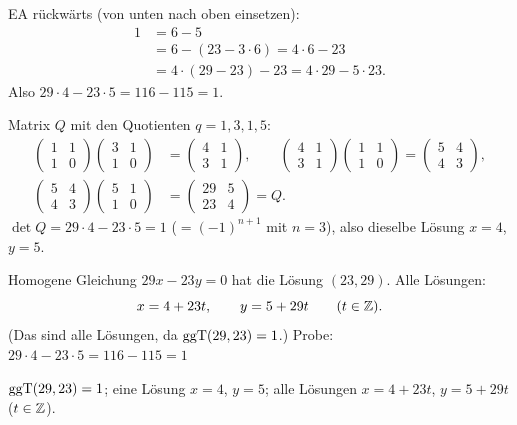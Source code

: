  EA rückwärts (von unten nach oben einsetzen):
\begin{align*}
1 &= 6 - 5\\
  &= 6 - (23 - 3 \cdot 6) = 4 \cdot 6 - 23\\
  &= 4 \cdot (29 - 23) - 23 = 4 \cdot 29 - 5 \cdot 23 .
\end{align*}
Also $29 \cdot 4 - 23 \cdot 5 = 116 - 115 = 1$.

Matrix $Q$ mit den Quotienten $q = 1, 3, 1, 5$:
\begin{align*}
\begin{pmatrix}1&1\\1&0\end{pmatrix}\begin{pmatrix}3&1\\1&0\end{pmatrix} &= \begin{pmatrix}4&1\\3&1\end{pmatrix},\qquad
\begin{pmatrix}4&1\\3&1\end{pmatrix}\begin{pmatrix}1&1\\1&0\end{pmatrix} = \begin{pmatrix}5&4\\4&3\end{pmatrix},\\
\begin{pmatrix}5&4\\4&3\end{pmatrix}\begin{pmatrix}5&1\\1&0\end{pmatrix} &= \begin{pmatrix}29&5\\23&4\end{pmatrix} = Q .
\end{align*}
$\det Q = 29 \cdot 4 - 23 \cdot 5 = 1$ ($= (-1)^{n+1}$ mit $n = 3$), also dieselbe Lösung $x = 4$, $y = 5$.

 Homogene Gleichung $29x - 23y = 0$ hat die Lösung $(23, 29)$. Alle Lösungen:
\[
x = 4 + 23t, \qquad y = 5 + 29t \qquad (t \in \mathbb{Z}).
\]
(Das sind alle Lösungen, da $\operatorname{ggT}(29, 23) = 1$.)
Probe: $29 \cdot 4 - 23 \cdot 5 = 116 - 115 = 1$ \checkmark
\begin{ergebnis} $\operatorname{ggT}(29,23) = 1$; eine Lösung $x = 4$, $y = 5$; alle Lösungen $x = 4 + 23t$, $y = 5 + 29t$ ($t \in \mathbb{Z}$). \end{ergebnis}

